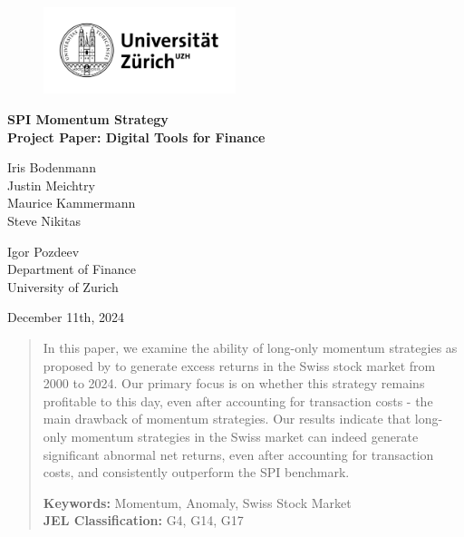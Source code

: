 \documentclass[a4paper,12pt]{article}
\begin{document}
    \begin{titlepage}
        \centering
        \begin{figure}[!h]
            \centering
            \includegraphics[width=0.5\textwidth]{Universität_Zürich_logo.png}
        \end{figure}
        \Large{\textbf{SPI Momentum Strategy \\ Project Paper: Digital Tools for Finance}\\}

        \vfill

        \large{Iris Bodenmann\\ Justin Meichtry\\ Maurice Kammermann \\ Steve Nikitas\\}

        \vfill

        \large{Igor Pozdeev\\Department of Finance\\ University of Zurich\\}

        \vfill
        \large{December 11th, 2024}

        \vfill
        \begin{abstract}
            In this paper, we examine the ability of long-only momentum strategies as proposed by \cite{jegatit1993} to generate excess returns in the Swiss stock market from 2000 to 2024. Our primary focus is on whether this strategy remains profitable to this day, even after accounting for transaction costs - the main drawback of momentum strategies. Our results indicate that long-only momentum strategies in the Swiss market can indeed generate significant abnormal net returns, even after accounting for transaction costs, and consistently outperform the SPI benchmark.  
            
            \vspace{2mm}
            
            \textbf{Keywords:} Momentum, Anomaly, Swiss Stock Market\\
            \textbf{JEL Classification:} G4, G14, G17
        \end{abstract}
    \end{titlepage}
    
\end{document}
